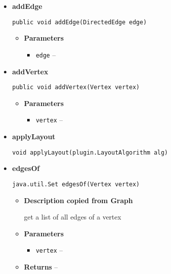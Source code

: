 {{{{{{{{{{{{{{\begin{itemize}
{\begin{itemize}
{Adds a new Edge to the graph
}
\end{itemize}
}%
\item{ 
{\bf  addEdge}\\
\begin{lstlisting}[frame=none]
public void addEdge(DirectedEdge edge)\end{lstlisting} %
\begin{itemize}
\item{
{\bf  Parameters}
  \begin{itemize}
   \item{
\texttt{edge} -- }
  \end{itemize}
}%
\end{itemize}
}%
\item{ 
{\bf  addVertex}\\
\begin{lstlisting}[frame=none]
public void addVertex(Vertex vertex)\end{lstlisting} %
\begin{itemize}
\item{
{\bf  Parameters}
  \begin{itemize}
   \item{
\texttt{vertex} -- }
  \end{itemize}
}%
\end{itemize}
}%
\item{ 
{\bf  applyLayout}\\
\begin{lstlisting}[frame=none]
void applyLayout(plugin.LayoutAlgorithm alg)\end{lstlisting} %
}%
\item{ 
{\bf  edgesOf}\\
\begin{lstlisting}[frame=none]
java.util.Set edgesOf(Vertex vertex)\end{lstlisting} %
\begin{itemize}
\item{
{\bf  Description copied from Graph{\small {}} }

get a list of all edges of a vertex
}
\item{
{\bf  Parameters}
  \begin{itemize}
   \item{
\texttt{vertex} -- }
  \end{itemize}
}%
\item{{\bf  Returns} -- 
 
}
\end{itemize}}
\end{itemize}}}}}}}}}}}}}}}
